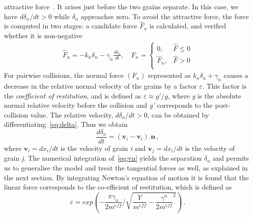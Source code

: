 attractive force~\citep{Poschel2005}. It arises just before the two grains 
separate. In this case, we have ${d{\delta_{n}}}$$/{dt} > 0$ while $\delta_{n}$ 
approaches zero. To avoid the attractive force, the force is computed in two 
stages: a candidate force $\hat{F}_{n}$ is calculated, and verified whether it 
is non-negative
%
\begin{align}
 {\hat{F}_{n}}=-{{k}_{n}}{{\delta}_{n}}-{{\gamma}_{n}}\frac{d{{\delta}_{n}}}{dt},
  \quad F_{n}=
\begin{cases}
0, & {\hat{F}} \le 0 \\
{\hat{F}}_{n}, & {\hat{F}} > 0 \\
\end{cases} \label{eq:nf}
\end{align} 
%
For pairwise collisions, the normal force $(F_{n})$ represented as 
${{k}_{n}}{{\delta}_{n}}+{{\gamma}_{n}}$ causes a decrease in the relative 
normal velocity of the grains by a factor $\varepsilon$. This factor is the 
\textit{coefficient of restitution}, and is defined as $\varepsilon\approx 
g'/g$, 
where \textit{g} is the absolute normal relative velocity before 
the collision and \textit{g'} corresponds to the post-collision value. The 
relative velocity, ${d{\delta_{n}}}$$/{dt} > 0$, can be obtained by 
differentiating~\cref{eq:delta}. Thus we obtain
%
\begin{equation}
\label{eq:vn}
\frac{d{\delta_{n}}}{dt}=(\mathbf{v}_{\mathit{i}}-\mathbf{v}_{\mathit{i}}).{\mathbf{n}}\,,
\end{equation}
%
where $\mathbf{v}_{\mathit{i}}=dx_{\mathit{i}}/dt$ is the velocity of grain 
\textit{i} and $\mathbf{v}_{\mathit{j}}=dx_{\mathit{i}}/dt$ is the velocity of 
grain \textit{j}. The numerical integration of~\cref{eq:vn} yields the 
separation $\delta_{n}$ and permits us to generalise the model and treat the 
tangential forces as well, as explained in the next section. By integrating 
Newton's equation of motion it is found that the linear force corresponds to 
the co-efficient of restitution, which is defined as
%
\begin{equation}
\varepsilon=exp(-\frac{\pi\gamma_{n}}{2m^{eff}}/\sqrt{\frac{Y}{m^{eff}}
-{\frac{\gamma^{n}}{2m^{eff}}}^{2}})\,.
\end{equation}
% 

